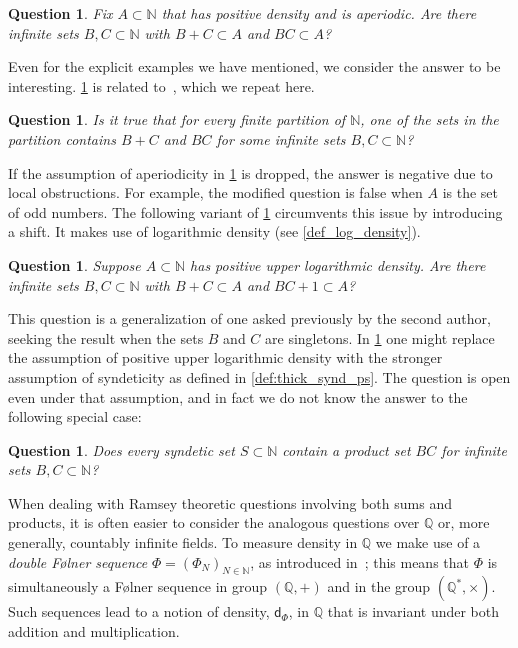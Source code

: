 \documentclass[10pt,dvipsnames]{article}
\newtheorem{question}[theorem]{Question}
\theoremstyle{definition}
\theoremstyle{plain}
\newcommand{\Q}{\mathbb{Q}}
\newcommand{\N}{\mathbb{N}}
\newcommand{\dens}{\mathsf{d}}
\newcommand{\Folner}{F\o{}lner}
\begin{document}
\begin{question}\label{question_sumsandproducts}
Fix $A \subset \N$ that has positive density and is aperiodic. Are there infinite sets $B,C \subset \N$ with $B+C \subset A$ and $BC \subset A$?
\end{question}

Even for the explicit examples we have mentioned, we consider the answer to be interesting.
\cref{question_sumsandproducts} is related to~\cite[Question 8.4]{KMRR}, which we repeat here.

\begin{question}\label{question_sumsandproductscoloring}
Is it true that for every finite partition of $\N$, one of the sets in the partition contains $B+C$ and $BC$ for some infinite sets $B,C\subset\N$?
\end{question}


If the assumption of aperiodicity in \cref{question_sumsandproducts} is dropped, the answer is negative due to local obstructions. 
For example, the modified question is false when $A$ is the set of odd numbers.
The following variant of \cref{question_sumsandproducts} circumvents this issue by introducing a shift. 
It makes use of logarithmic density (see \cref{def_log_density}).

\begin{question}\label{question_sumsandproducts_shift}
Suppose $A\subset\N$ has positive upper logarithmic density. Are there infinite sets $B,C \subset \N$ with $B+C \subset A$ and $BC+1 \subset A$?
\end{question}
This question is a generalization of one asked previously by the second author, seeking the result when the sets $B$ and $C$ are singletons.
In \cref{question_sumsandproducts_shift} one might replace the assumption of positive upper logarithmic density with the stronger assumption of syndeticity as defined in \cref{def:thick_synd_ps}. The question is open even under that assumption, and in fact we do not know the answer to the following special case: 

\begin{question}\label{question_syndeticproducts}
    Does every syndetic set $S\subset\N$ contain a product set $BC$ for infinite sets $B,C\subset\N$?
\end{question}

When dealing with Ramsey theoretic questions involving both sums and products, it is often easier to consider the analogous questions over $\Q$ or, more generally, countably infinite fields.
To measure density in $\Q$ we make use of a \emph{double \Folner{} sequence} $\Phi=(\Phi_N)_{N\in\N}$, as introduced in~\cite[Definition 1.3]{Bergelson_Moreira17}; this means that $\Phi$ is simultaneously a \Folner{} sequence in group $(\Q,+)$ and in the group $(\Q^*,\times)$.
Such sequences lead to a notion of density, $\dens_{\Phi}$, in $\Q$ that is invariant under both addition and multiplication.
\end{document}

